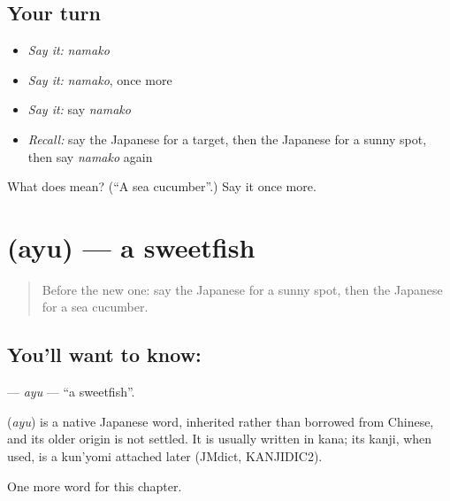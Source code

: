 \subsection*{Your turn}
\begin{itemize}
\raggedright
  \item \emph{Say it:} \emph{namako}
  \item \emph{Say it:} \emph{namako}, once more
  \item \emph{Say it:} say \emph{namako}
  \item \emph{Recall:} say the Japanese for a target, then the Japanese for a sunny spot, then say \emph{namako} again
\end{itemize}

\begin{tcolorbox}[breakable,colback=teal!4,colframe=teal!35!black,title={Before you move on}]
What does  mean? (\textquotedblleft{}A sea cucumber\textquotedblright{}.) Say it once more.
\end{tcolorbox}
\section[\texorpdfstring{\ja{あゆ} (ayu)}{あゆ (ayu)}]{ (ayu) — a sweetfish}

\label{lesson:JA-C115-ayu}



\begin{quote}
Before the new one: say the Japanese for a sunny spot, then the Japanese for a sea cucumber.
\end{quote}

\subsection*{You'll want to know: }
\textbf{} — \emph{ayu} — \textquotedblleft{}a sweetfish\textquotedblright{}.

\begin{cousinweb}
\textbf{} (\emph{ayu}) is a native Japanese word, inherited rather than borrowed from Chinese, and its older origin is not settled. It is usually written in kana; its kanji, when used, is a kun'yomi attached later (JMdict, KANJIDIC2).
\end{cousinweb}

\begin{grammarlens}[title={What you've built}]
One more word for this chapter.
\end{grammarlens}

